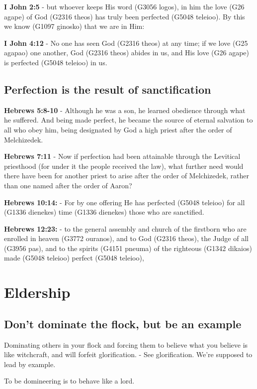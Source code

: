 \documentclass[11pt]{article}
\begin{document}
\textbf{I John 2:5} - but whoever keeps His word (G3056 logos), in him the love (G26 agape) of God (G2316 theos) has truly been perfected (G5048 teleioo). By this we know (G1097 ginosko) that we are in Him:

\textbf{I John 4:12} - No one has seen God (G2316 theos) at any time; if we love (G25 agapao) one another, God (G2316 theos) abides in us, and His love (G26 agape) is perfected (G5048 teleioo) in us.

\subsection{Perfection is the result of sanctification}
\label{sec:orgc7fbaec}

\textbf{Hebrews 5:8-10} - Although he was a son, he learned obedience through what he suffered. And being made perfect, he became the source of eternal salvation to all who obey him, being designated by God a high priest after the order of Melchizedek.

\textbf{Hebrews 7:11} - Now if perfection had been attainable through the Levitical priesthood (for under it the people received the law), what further need would there have been for another priest to arise after the order of Melchizedek, rather than one named after the order of Aaron?

\textbf{Hebrews 10:14:} - For by one offering He has perfected (G5048 teleioo) for all (G1336 dienekes) time (G1336 dienekes) those who are sanctified.

\textbf{Hebrews 12:23:} - to the general assembly and church of the firstborn who are enrolled in heaven (G3772 ouranos), and to God (G2316 theos), the Judge of all (G3956 pas), and to the spirits (G4151 pneuma) of the righteous (G1342 dikaios) made (G5048 teleioo) perfect (G5048 teleioo),

\section{Eldership}
\label{sec:org7782bd0}
\subsection{Don't dominate the flock, but be an example}
\label{sec:org9b03993}
Dominating others in your flock and forcing them to believe what you believe is like witchcraft, and will forfeit glorification. - See glorification.
We're supposed to lead by example.

To be domineering is to behave like a lord.
\end{document}
